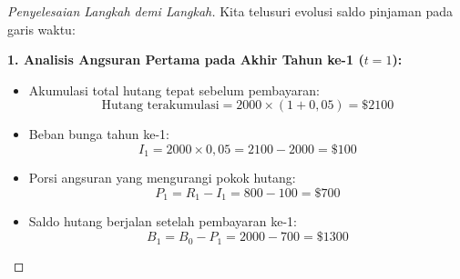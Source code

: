 \documentclass[11pt,a4paper]{article}
\begin{document}
\begin{proof}[Penyelesaian Langkah demi Langkah]
Kita telusuri evolusi saldo pinjaman pada garis waktu:

\begin{center}
\end{center}

\noindent\textbf{1. Analisis Angsuran Pertama pada Akhir Tahun ke-1 ($t=1$):}\\[0.3em]
\begin{itemize}
    \item Akumulasi total hutang tepat sebelum pembayaran:
    \begin{equation*}
        \text{Hutang terakumulasi} = 2000 \times (1 + 0{,}05) = \$2100
    \end{equation*}
    \item Beban bunga tahun ke-1:
    \begin{equation*}
        I_1 = 2000 \times 0{,}05 = 2100 - 2000 = \$100
    \end{equation*}
    \item Porsi angsuran yang mengurangi pokok hutang:
    \begin{equation*}
        P_1 = R_1 - I_1 = 800 - 100 = \$700
    \end{equation*}
    \item Saldo hutang berjalan setelah pembayaran ke-1:
    \begin{equation*}
        B_1 = B_0 - P_1 = 2000 - 700 = \$1300
    \end{equation*}
\end{itemize}


\end{proof}
\end{document}
